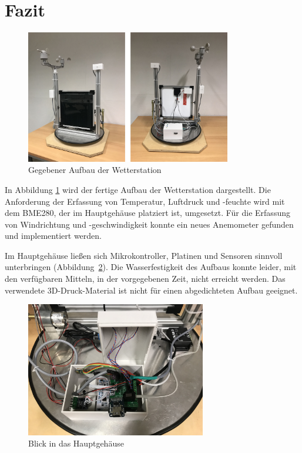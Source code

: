 \section{Fazit}\label{sec:fazit}
\begin{figure}[H]
  \centering
  \includegraphics[width=0.8\textwidth]{./img/Wetterstaion_fertig1.jpg}
  \caption{Gegebener Aufbau der Wetterstation}\label{fig.Wetterstationfertig}
\end{figure}

In Abbildung \ref{fig.Wetterstationfertig} wird der fertige Aufbau der Wetterstation dargestellt. Die Anforderung der Erfassung von Temperatur, Luftdruck und -feuchte wird mit dem BME280, der im Hauptgehäuse platziert ist, umgesetzt. Für die Erfassung von Windrichtung und -geschwindigkeit konnte ein neues Anemometer gefunden und implementiert werden.

Im Hauptgehäuse ließen sich Mikrokontroller, Platinen und Sensoren sinnvoll unterbringen (Abbildung~\ref{fig.hauptgehauese}). Die Wasserfestigkeit des Aufbaus konnte leider, mit den verfügbaren Mitteln, in der vorgegebenen Zeit, nicht erreicht werden. Das verwendete 3D-Druck-Material ist nicht für einen abgedichteten Aufbau geeignet. 


\begin{figure}[H]
  \centering
  \includegraphics[width=0.7\textwidth]{./img/Hauptgehauese.jpg}
  \caption{Blick in das Hauptgehäuse}\label{fig.hauptgehauese}
\end{figure}

